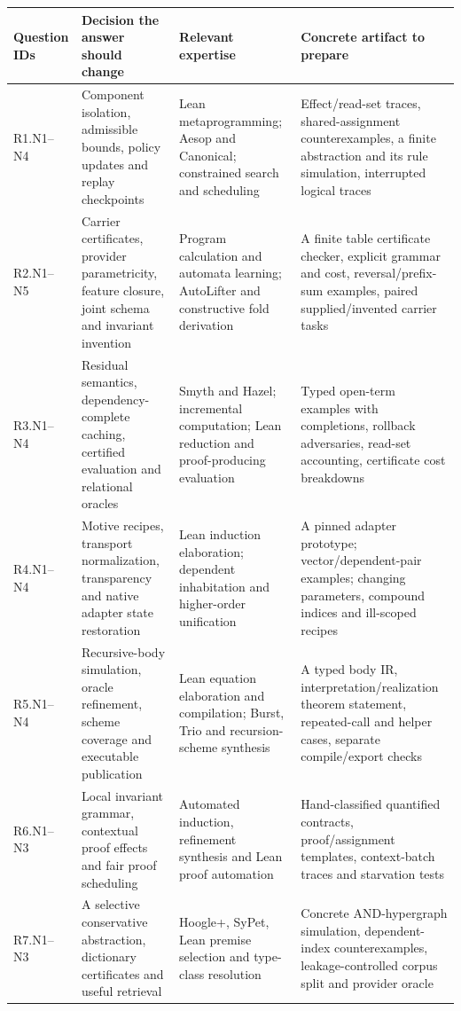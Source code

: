 \begin{longtable}{@{}L{17mm}L{43mm}L{42mm}L{44mm}@{}}
\toprule
Question IDs & Decision the answer should change & Relevant expertise & Concrete artifact to prepare\\
\midrule
\endhead
R1.N1--N4 & Component isolation, admissible bounds, policy updates and replay checkpoints & Lean metaprogramming; Aesop and Canonical; constrained search and scheduling & Effect/read-set traces, shared-assignment counterexamples, a finite abstraction and its rule simulation, interrupted logical traces\\
R2.N1--N5 & Carrier certificates, provider parametricity, feature closure, joint schema and invariant invention & Program calculation and automata learning; AutoLifter and constructive fold derivation & A finite table certificate checker, explicit grammar and cost, reversal/prefix-sum examples, paired supplied/invented carrier tasks\\
R3.N1--N4 & Residual semantics, dependency-complete caching, certified evaluation and relational oracles & Smyth and Hazel; incremental computation; Lean reduction and proof-producing evaluation & Typed open-term examples with completions, rollback adversaries, read-set accounting, certificate cost breakdowns\\
R4.N1--N4 & Motive recipes, transport normalization, transparency and native adapter state restoration & Lean induction elaboration; dependent inhabitation and higher-order unification & A pinned adapter prototype; vector/dependent-pair examples; changing parameters, compound indices and ill-scoped recipes\\
R5.N1--N4 & Recursive-body simulation, oracle refinement, scheme coverage and executable publication & Lean equation elaboration and compilation; Burst, Trio and recursion-scheme synthesis & A typed body IR, interpretation/realization theorem statement, repeated-call and helper cases, separate compile/export checks\\
R6.N1--N3 & Local invariant grammar, contextual proof effects and fair proof scheduling & Automated induction, refinement synthesis and Lean proof automation & Hand-classified quantified contracts, proof/assignment templates, context-batch traces and starvation tests\\
R7.N1--N3 & A selective conservative abstraction, dictionary certificates and useful retrieval & Hoogle+, SyPet, Lean premise selection and type-class resolution & Concrete AND-hypergraph simulation, dependent-index counterexamples, leakage-controlled corpus split and provider oracle\\

\end{longtable}
